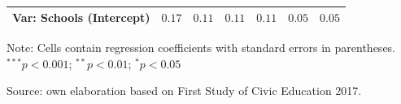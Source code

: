 \documentclass[
  12pt,
  letterpaper,
]{article}
\begin{document}
\begin{table}
{\begin{center}
{\begin{threeparttable}
\begin{tabular}{l c c c c c c}
Var: Schools (Intercept)                               & $0.17$        & $0.11$        & $0.11$        & $0.11$        & $0.05$        & $0.05$        \\
\bottomrule
\end{tabular}
\begin{tablenotes}[flushleft]
\scriptsize{\item Note: Cells contain regression coefficients with standard errors in parentheses. $^{***}p<0.001$; $^{**}p<0.01$; $^{*}p<0.05$ \\ \item Source: own elaboration based on First Study of Civic Education 2017.}
\end{tablenotes}
\end{threeparttable}
}
\caption{}
\label{table:coefficients}
\end{center}

}

\end{table}%
\end{document}

